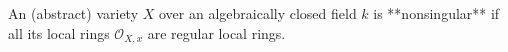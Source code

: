 An (abstract) variety $X$ over an algebraically closed field $k$ is **nonsingular** if all its local rings $\mathcal{O}_{X,x}$ are regular local rings.
